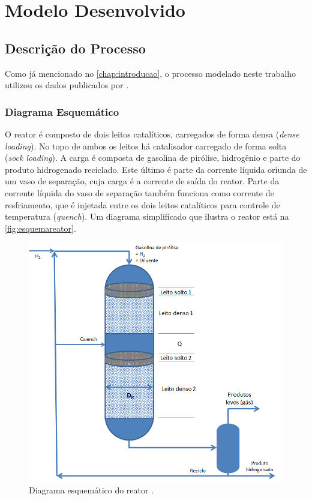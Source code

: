 %
\chapter{Modelo Desenvolvido}
\label{chap:moddesenvolvidos}

\section{Descrição do Processo} \label{sec:descricaoprocesso}

Como já mencionado no \autoref{chap:introducao}, o processo modelado
neste trabalho utilizou os dados publicados por . 

\subsection{Diagrama Esquemático} \label{sec:diagramaesquematico}

O reator é composto de dois leitos catalíticos, carregados de forma
densa (\emph{dense loading}). No topo de ambos os leitos há catalisador carregado de
forma solta (\emph{sock loading}). A carga é composta de gasolina de pirólise,
hidrogênio e parte do produto hidrogenado reciclado. Este último é parte da
corrente líquida oriunda de um vaso de separação, cuja carga é a corrente de
saída do reator. Parte da corrente líquida do vaso de separação também funciona
como corrente de resfriamento, que é injetada entre os dois leitos catalíticos
para controle de temperatura (\emph{quench}). Um diagrama simplificado que
ilustra o reator está na \autoref{fig:esquemareator}.

\begin{figure}[htb]
\centering \includegraphics[scale=0.75]{images/Chap3/esquemareatorb.png}
\caption{Diagrama esquemático do reator \cite{Rojas2014a}.}
\label{fig:esquemareator}
\end{figure}

